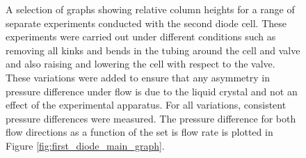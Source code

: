 \begin{figure}
\begin{center}
\end{center}
\caption[Preliminary column heights for different experimental setups]{\label{fig:first_diode_small_graphs}A selection of graphs showing relative column heights for a range of separate experiments conducted with the second diode cell. These experiments were carried out under different conditions such as removing all kinks and bends in the tubing around the cell and valve and also raising and lowering the cell with respect to the valve. These variations were added to ensure that any asymmetry in pressure difference under flow is due to the liquid crystal and not an effect of the experimental apparatus. For all variations, consistent pressure differences were measured. The pressure difference for both flow directions as a function of the set is flow rate is plotted in Figure \ref{fig:first_diode_main_graph}.}
\end{figure}

